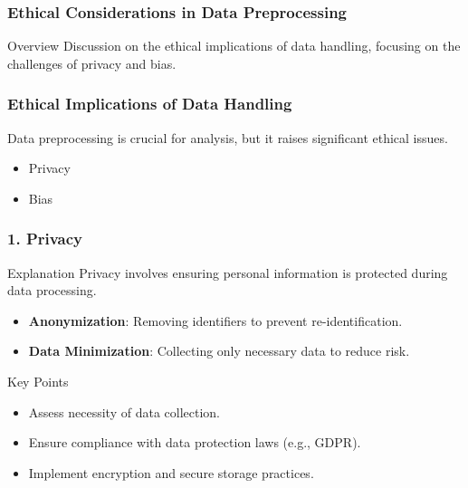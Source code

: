 \documentclass[aspectratio=169]{beamer}
\begin{document}
\begin{frame}[fragile]
    \frametitle{Ethical Considerations in Data Preprocessing}
    \begin{block}{Overview}
        Discussion on the ethical implications of data handling, focusing on the challenges of privacy and bias.
    \end{block}
\end{frame}

\begin{frame}[fragile]
    \frametitle{Ethical Implications of Data Handling}
    Data preprocessing is crucial for analysis, but it raises significant ethical issues. 
    \begin{itemize}
        \item Privacy
        \item Bias
    \end{itemize}
\end{frame}

\begin{frame}[fragile]
    \frametitle{1. Privacy}
    \begin{block}{Explanation}
        Privacy involves ensuring personal information is protected during data processing.
    \end{block}
    \begin{itemize}
        \item \textbf{Anonymization}: Removing identifiers to prevent re-identification.
        \item \textbf{Data Minimization}: Collecting only necessary data to reduce risk.
    \end{itemize}
    \begin{block}{Key Points}
        \begin{itemize}
            \item Assess necessity of data collection.
            \item Ensure compliance with data protection laws (e.g., GDPR).
            \item Implement encryption and secure storage practices.
        \end{itemize}
    \end{block}
\end{frame}
\end{document}
